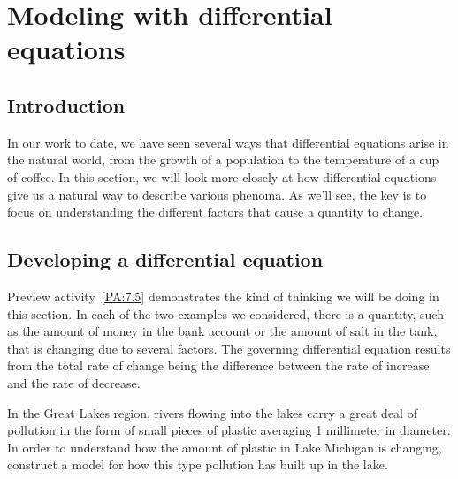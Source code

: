 \section{Modeling with differential equations} \label{S:7.5.Modeling}

\vspace*{-14 pt}

\subsection*{Introduction}

In our work to date, we have seen several ways that
differential equations arise in the natural world, from the growth of
a population to the temperature of a cup of coffee.  In this section,
we will look more closely at how differential equations give us a
natural way to describe various phenoma.  As we'll see, the key is to
focus on understanding the different factors that cause a quantity to
change.



\subsection*{Developing a differential equation}

Preview activity~\ref{PA:7.5} demonstrates the kind of thinking we will be
doing in this section.  In each of the two examples we considered, there is a
quantity, such as the amount of money in the bank account or the
amount of salt in the tank, that is changing due to several factors.
The governing differential equation results from the total rate of change being the difference between the rate of
increase and the rate of decrease.

\bex \label{Ex:7.5.1}
In the Great Lakes region, rivers flowing into the lakes carry a great
deal of pollution in the form of small pieces of plastic averaging 1
millimeter in diameter.  In order to understand how the amount of
plastic in Lake Michigan is changing, construct a model for how this type pollution has built up in the lake.
\eex


